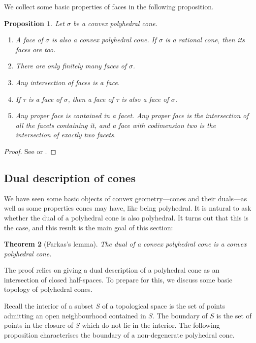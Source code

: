 \documentclass[12pt]{amsart}
\theoremstyle{plain}
\newtheorem{theorem}{Theorem}[subsection]
\newtheorem{proposition}[theorem]{Proposition}
\begin{document}
We collect some basic properties of faces in the following proposition.

\begin{proposition}
Let $\sigma$ be a convex polyhedral cone.
\begin{enumerate}
\item A face of $\sigma$ is also a convex polyhedral cone.
If $\sigma$ is a rational cone, then its faces are too.
\item There are only finitely many faces of $\sigma$.
\item Any intersection of faces is a face.
\item If $\tau$ is a face of $\sigma$, then a face of $\tau$ is also a face of $\sigma$.
\item Any proper face is contained in a facet.
Any proper face is the intersection of all the facets containing it, and a face with codimension two is the intersection of exactly two facets.
\end{enumerate}
\end{proposition}
\begin{proof}
See \cite[\S 1.2]{Fulton93} or \cite[\S 1]{Zaman13}.
\end{proof}





\subsection{Dual description of cones}\label{section:dualdescription}
We have seen some basic objects of convex geometry---cones and their duals---as well as some properties cones may have, like being polyhedral.
It is natural to ask whether the dual of a polyhedral cone is also polyhedral.
It turns out that this is the case, and this result is the main goal of this section:

\begin{theorem}[Farkas's lemma]\label{theorem:farkas}
The dual of a convex polyhedral cone is a convex polyhedral cone.
\end{theorem}

The proof relies on giving a dual description of a polyhedral cone as an intersection of closed half-spaces.
To prepare for this, we discuss some basic topology of polyhedral cones.

Recall the interior of a subset $S$ of a topological space is the set of points admitting an open neighbourhood contained in $S$.
The boundary of $S$ is the set of points in the closure of $S$ which do not lie in the interior.
The following proposition characterises the boundary of a non-degenerate polyhedral cone.
\end{document}
